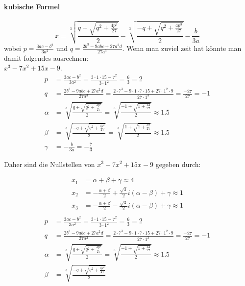 \documentclass{report}
\begin{document}
\paragraph{kubische Formel}
\label{par:kubische Formel}
\[x = \sqrt[3]{\frac{q + \sqrt{q^2 + \frac{4p^3}{27}}}{2}} - \sqrt[3]{\frac{-q + \sqrt{q^2 + \frac{4p^3}{27}}}{2}} - \frac{b}{3a}\]
wobei $p = \frac{3ac - b^2}{3a^2}$ und $q = \frac{2b^3 - 9abc + 27a^2d}{27a^3}$.
Wenn man zuviel zeit hat könnte man damit folgendes ausrechnen:\\
$x^3-7x^2+15x-9$.
\begin{align*}
p &= \frac{3ac - b^2}{3a^2} = \frac{3 \cdot 1 \cdot 15 - 7^2}{3 \cdot 1^2} = \frac{6}{3} = 2 \\
q &= \frac{2b^3 - 9abc + 27a^2d}{27a^3} = \frac{2 \cdot 7^3 - 9 \cdot 1 \cdot 7 \cdot 15 + 27 \cdot 1^2 \cdot 9}{27 \cdot 1^3} = \frac{-27}{27} = -1 \\
\alpha &= \sqrt[3]{\frac{q + \sqrt{q^2 + \frac{4p^3}{27}}}{2}} = \sqrt[3]{\frac{-1 + \sqrt{1 + \frac{32}{27}}}{2}} \approx 1.5 \\
\beta &= \sqrt[3]{\frac{-q + \sqrt{q^2 + \frac{4p^3}{27}}}{2}} = \sqrt[3]{\frac{1 + \sqrt{1 + \frac{32}{27}}}{2}} \approx 1.5 \\
\gamma &= -\frac{b}{3a} = -\frac{7}{3}
\end{align*}

Daher sind die Nullstellen von $x^3 - 7x^2 + 15x - 9$ gegeben durch:

\begin{align*}
x_1 &= \alpha + \beta + \gamma \approx 4 \\
x_2 &= -\frac{\alpha + \beta}{2} + \frac{\sqrt{3}}{2}i(\alpha - \beta) + \gamma \approx 1 \\
x_3 &= -\frac{\alpha + \beta}{2} - \frac{\sqrt{3}}{2}i(\alpha - \beta) + \gamma \approx 1 \\
\end{align*}
\begin{align*}
p &= \frac{3ac - b^2}{3a^2} = \frac{3 \cdot 1 \cdot 15 - 7^2}{3 \cdot 1^2} = \frac{6}{3} = 2 \\
q &= \frac{2b^3 - 9abc + 27a^2d}{27a^3} = \frac{2 \cdot 7^3 - 9 \cdot 1 \cdot 7 \cdot 15 + 27 \cdot 1^2 \cdot 9}{27 \cdot 1^3} = \frac{-27}{27} = -1 \\
\alpha &= \sqrt[3]{\frac{q + \sqrt{q^2 + \frac{4p^3}{27}}}{2}} = \sqrt[3]{\frac{-1 + \sqrt{1 + \frac{32}{27}}}{2}} \approx 1.5 \\
\beta &= \sqrt[3]{\frac{-q + \sqrt{q^2 + \frac{4p^3}{27}}}{2}}
\end{align*}
\end{document}

